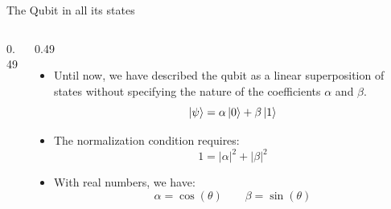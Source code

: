 \documentclass[aspectratio=169,12pt]{beamer}
\begin{document}
\begin{frame}{The Qubit in all its states}
    \begin{columns}[T]
    \begin{column}{0.49\textwidth}
      \begin{center}
      \end{center}
    \end{column}
    \begin{column}{0.49\textwidth}
    \begin{itemize}
        \item Until now, we have described the qubit as a linear superposition of states without specifying the nature of the coefficients $\alpha$ and $\beta$.
        \begin{equation*}
            \ket{\psi} = \alpha \ket{0} + \beta \ket{1}
        \end{equation*}
        \item The normalization condition requires:
        \begin{equation*}
            1 = |\alpha|^{2} + |\beta|^{2}
        \end{equation*}
        \item With real numbers, we have:
        \begin{equation*}
            \alpha = \cos(\theta) \qquad \beta = \sin(\theta)
        \end{equation*} 
    \end{itemize}
    \end{column}
    \end{columns}
\end{frame}
\end{document}
